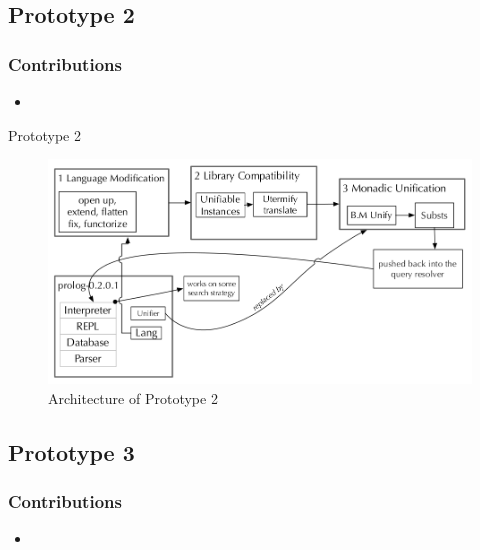 \documentclass[hideothersubsections, t, aspectratio=1610]{beamer}
\begin{document}
\subsection{Prototype 2}

\begin{frame}
\frametitle{Contributions}
\begin{itemize}
\item
\end{itemize}
\end{frame}

\begin{frame}{Prototype 2}
\begin{figure}[H]
  \includegraphics[width=1\textwidth]{Prototype-2-architecture.jpeg}
  \caption{Architecture of Prototype 2}
  \label{fig:proto1-arch}
\end{figure}

\end{frame}


\subsection{Prototype 3}

\begin{frame}
\frametitle{Contributions}
\begin{itemize}
\item
\end{itemize}
\end{frame}
\end{document}
